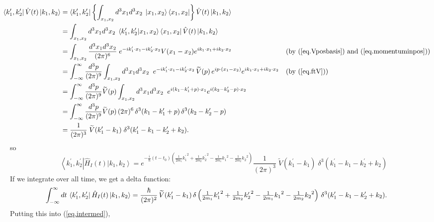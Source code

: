 \documentclass[11pt]{article}
\newcommand{\bra}[1]{\left\langle#1\right|}
\newcommand{\ket}[1]{\left|#1\right\rangle}
\newcommand{\braket}[2]{\left\langle#1|#2\right\rangle}
\newcommand{\op}[1]{\hat{#1}}
\theoremstyle{theorem}
\theoremstyle{remark}
\theoremstyle{step}
\theoremstyle{gap}
\begin{document}
\begin{align*}
\hspace{-1em}\bra{k_1^\prime, k_2^\prime} \op{V}(t) \ket{k_1, k_2} &= \bra{k_1^\prime, k_2^\prime} \left\{\int_{x_1, x_2} {d^3 x_1 d^3 x_2\;} \ket{x_1, x_2}\bra{x_1, x_2}\right\}\op{V}(t) \ket{k_1, k_2} \nonumber\\
&= \int_{x_1, x_2} {d^3 x_1 d^3 x_2\;} \braket{k_1^\prime, k_2^\prime}{x_1, x_2}\bra{x_1, x_2}\op{V}(t) \ket{k_1, k_2} \nonumber\\
&= \int_{x_1, x_2} \frac{d^3 x_1 d^3 x_2}{(2\pi)^6}\; e^{-ik_1^\prime\cdot x_1 - ik_2^\prime\cdot x_2}V(x_1 - x_2) e^{ik_1\cdot x_1 + ik_2\cdot x_2} &&\text{(by (\ref{eq.Vposbasis}) and (\ref{eq.momentuminpos}))}\nonumber\\
&= \int_{-\infty}^{\infty} \frac{d^3p}{(2\pi)^9}\int_{x_1, x_2} {d^3 x_1 d^3 x_2\;\;}e^{-ik_1^\prime\cdot x_1 - ik_2^\prime\cdot x_2}\,\widetilde{V}(p)\,e^{ip\cdot(x_1-x_2)} e^{ik_1\cdot x_1 + ik_2\cdot x_2}
&&\text{(by (\ref{eq.ftV}))}\nonumber\\
&= \int_{-\infty}^{\infty} \frac{d^3p}{(2\pi)^9}\widetilde{V}(p) \int_{x_1, x_2} {d^3 x_1 d^3 x_2\;\;}e^{i(k_1-k_1^\prime+p)\cdot x_1}e^{i(k_2-k_2^\prime-p)\cdot x_2}\nonumber\\
&= \int_{-\infty}^{\infty} \frac{d^3p}{(2\pi)^9}\widetilde{V}(p) \,(2\pi)^6\,\delta^3(k_1-k_1^\prime+p)\,\delta^3(k_2-k_2^\prime-p)\nonumber\\
&= \frac{1}{(2\pi)^3}\;\widetilde{V}(k_1^\prime-k_1) \;\delta^3(k_1^\prime-k_1-k_2^\prime+k_2).
\end{align*}
so 
\[
\bra{k_1^\prime, k_2^\prime} \op{H}_I(t)\ket{k_1, k_2}
=
e^{-\frac{i}{\hbar}\left(t-t_0\right)\left(\frac{1}{2m_1}{k_1^\prime}^2 + \frac{1}{2m_2}{k_2^\prime}^2 - \frac{1}{2m_1}{k_1}^2 - \frac{1}{2m_2}{k_2}^2\right)}\frac{1}{(2\pi)^3}\;\widetilde{V}(k_1^\prime-k_1) \;\delta^3(k_1^\prime-k_1-k_2^\prime+k_2)
\]
If we integrate over all time, we get a delta function:
\begin{equation}\label{eq.HIintegrated}
\hspace{-2em}
\int_{-\infty}^\infty dt \,\bra{k_1^\prime, k_2^\prime} \op{H}_I(t)\ket{k_1, k_2}
=
\frac{\hbar}{(2\pi)^2}\,\widetilde{V}(k_1^\prime-k_1)\,\delta\left({\textstyle\frac{1}{2m_1}{k_1^\prime}^2 + \frac{1}{2m_2}{k_2^\prime}^2 - \frac{1}{2m_1}{k_1}^2 - \frac{1}{2m_2}{k_2}^2}\right) \,\delta^3(k_1^\prime-k_1-k_2^\prime+k_2).
\end{equation}
Putting this into (\ref{eq.intermed}),
\end{document}
